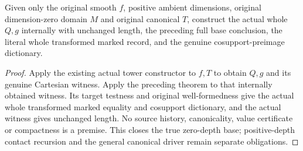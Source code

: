 \begin{theorem}
\label{hir:smooth-original-zero-family-constructor}
\leanok
{}
Given only the original smooth $f$, positive ambient dimensions, original
dimension-zero domain $M$ and original canonical $T$, construct the actual
whole $Q,g$ internally with unchanged length, the preceding full base
conclusion, the literal whole transformed marked record, and the genuine
cosupport-preimage dictionary.
\end{theorem}
\begin{proof}
Apply the existing actual tower constructor to $f,T$ to obtain $Q,g$ and
its genuine Cartesian witness. Apply the preceding theorem to that
internally obtained witness. Its target testness and original
well-formedness give the actual whole transformed marked equality and
cosupport dictionary, and the actual witness gives unchanged length.
No source history, canonicality, value certificate or compactness is a
premise. This closes the true zero-depth base; positive-depth contact
recursion and the general canonical driver remain separate obligations.
\end{proof}
